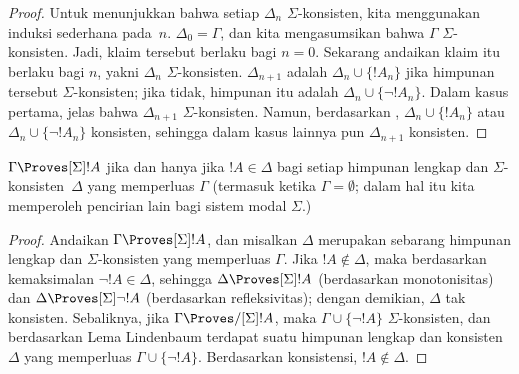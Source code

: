 \documentclass[../../../include/open-logic-section]{subfiles}
\begin{document}
\begin{proof}
Untuk menunjukkan bahwa setiap $\Delta_n$ $\Sigma$-konsisten, kita
menggunakan induksi sederhana pada~$n$. $\Delta_0 = \Gamma$, dan kita
mengasumsikan bahwa $\Gamma$ $\Sigma$-konsisten. Jadi, klaim tersebut berlaku
bagi $n = 0$. Sekarang andaikan klaim itu berlaku bagi $n$, yakni $\Delta_n$
$\Sigma$-konsisten. $\Delta_{n+1}$ adalah $\Delta_n \cup \{!A_n\}$ jika
himpunan tersebut $\Sigma$-konsisten; jika tidak, himpunan itu adalah
$\Delta_n \cup \{\lnot!A_n\}$. Dalam kasus pertama, jelas bahwa
$\Delta_{n+1}$ $\Sigma$-konsisten. Namun, berdasarkan
,
$\Delta_n \cup \{!A_n\}$ atau $\Delta_n \cup \{\lnot!A_n\}$ konsisten,
sehingga dalam kasus lainnya pun $\Delta_{n+1}$ konsisten.
\end{proof}

\begin{cor}
  $\Gamma \Proves[\Sigma] !A$ jika dan hanya jika $!A \in \Delta$ bagi
  setiap himpunan lengkap dan $\Sigma$-konsisten~$\Delta$ yang memperluas
  $\Gamma$ (termasuk ketika $\Gamma = \emptyset$; dalam hal itu kita
  memperoleh pencirian lain bagi sistem modal $\Sigma$.)
\end{cor}

\begin{proof}
  Andaikan $\Gamma \Proves[\Sigma] !A$, dan misalkan $\Delta$ merupakan
  sebarang himpunan lengkap dan $\Sigma$-konsisten yang memperluas $\Gamma$.
  Jika $!A \notin \Delta$, maka berdasarkan kemaksimalan
  $\lnot!A \in \Delta$, sehingga $\Delta \Proves[\Sigma] !A$ (berdasarkan
  monotonisitas) dan $\Delta \Proves[\Sigma] \lnot!A$ (berdasarkan
  refleksivitas); dengan demikian, $\Delta$ tak konsisten. Sebaliknya, jika
  $\Gamma \Proves/[\Sigma] !A$, maka $\Gamma \cup \{ \lnot!A\}$
  $\Sigma$-konsisten, dan berdasarkan Lema Lindenbaum terdapat suatu himpunan
  lengkap dan konsisten~$\Delta$ yang memperluas
  $\Gamma \cup \{ \lnot!A \}$. Berdasarkan konsistensi, $!A
  \notin \Delta$.
\end{proof}
\end{document}
